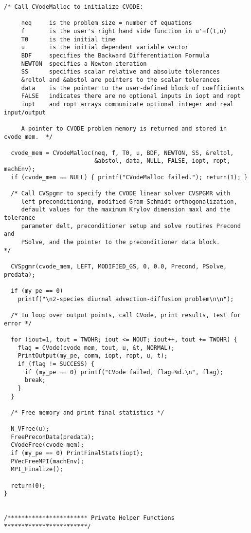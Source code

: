 \begin{verbatim}
/* Call CVodeMalloc to initialize CVODE: 

     neq     is the problem size = number of equations
     f       is the user's right hand side function in u'=f(t,u)
     T0      is the initial time
     u       is the initial dependent variable vector
     BDF     specifies the Backward Differentiation Formula
     NEWTON  specifies a Newton iteration
     SS      specifies scalar relative and absolute tolerances
     &reltol and &abstol are pointers to the scalar tolerances
     data    is the pointer to the user-defined block of coefficients
     FALSE   indicates there are no optional inputs in iopt and ropt
     iopt    and ropt arrays communicate optional integer and real input/output

     A pointer to CVODE problem memory is returned and stored in cvode_mem.  */

  cvode_mem = CVodeMalloc(neq, f, T0, u, BDF, NEWTON, SS, &reltol,
                          &abstol, data, NULL, FALSE, iopt, ropt, machEnv);
  if (cvode_mem == NULL) { printf("CVodeMalloc failed."); return(1); }

  /* Call CVSpgmr to specify the CVODE linear solver CVSPGMR with
     left preconditioning, modified Gram-Schmidt orthogonalization,
     default values for the maximum Krylov dimension maxl and the tolerance
     parameter delt, preconditioner setup and solve routines Precond and
     PSolve, and the pointer to the preconditioner data block.               */

  CVSpgmr(cvode_mem, LEFT, MODIFIED_GS, 0, 0.0, Precond, PSolve, predata);

  if (my_pe == 0)
    printf("\n2-species diurnal advection-diffusion problem\n\n");

  /* In loop over output points, call CVode, print results, test for error */

  for (iout=1, tout = TWOHR; iout <= NOUT; iout++, tout += TWOHR) {
    flag = CVode(cvode_mem, tout, u, &t, NORMAL);
    PrintOutput(my_pe, comm, iopt, ropt, u, t);
    if (flag != SUCCESS) {
      if (my_pe == 0) printf("CVode failed, flag=%d.\n", flag);
      break;
    }
  }

  /* Free memory and print final statistics */  

  N_VFree(u);
  FreePreconData(predata);
  CVodeFree(cvode_mem);
  if (my_pe == 0) PrintFinalStats(iopt);
  PVecFreeMPI(machEnv);
  MPI_Finalize();

  return(0);
}


/*********************** Private Helper Functions ************************/


\end{verbatim}
